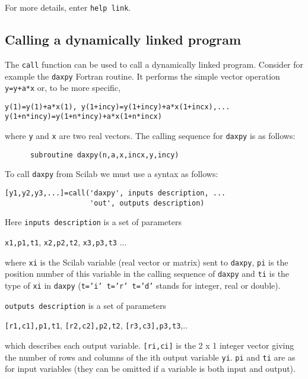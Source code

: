 For more details, enter {\tt help link}.

\subsection{Calling a dynamically linked program}

The {\tt call} function can be used to call a dynamically linked
program. Consider for example the {\tt daxpy} Fortran routine. It performs 
the simple vector operation {\tt y=y+a*x} or, to be more specific, 
\begin{verbatim}
y(1)=y(1)+a*x(1), y(1+incy)=y(1+incy)+a*x(1+incx),...
y(1+n*incy)=y(1+n*incy)+a*x(1+n*incx)
\end{verbatim} 
where {\tt y} and {\tt x} are two real vectors.
The calling sequence for {\tt daxpy} is as follows:
\begin{verbatim}
      subroutine daxpy(n,a,x,incx,y,incy)
\end{verbatim}
To call {\tt daxpy} from Scilab we must use a syntax as follows: 
\begin{verbatim}
[y1,y2,y3,...]=call('daxpy', inputs description, ...
                    'out', outputs description)
\end{verbatim}
\noindent
Here {\tt inputs description} is a set of parameters
 
{\tt x1,p1,t1}, {\tt x2,p2,t2}, {\tt x3,p3,t3} ... 

\noindent
where {\tt xi} is the Scilab variable (real vector or matrix) sent to 
{\tt daxpy},
{\tt pi} is the position number of this variable in the calling
sequence of {\tt daxpy} and {\tt ti} is the type of {\tt xi} in {\tt daxpy}
({\tt t='i'  t='r'  t='d'} stands for integer, real or double).

\noindent
{\tt outputs description} is a set of parameters
 
{\tt [r1,c1],p1,t1}, {\tt [r2,c2],p2,t2}, {\tt [r3,c3],p3,t3},..

\noindent
which describes each output variable. {\tt [ri,ci]} is the
2 x 1 integer vector giving the number of rows and columns of the
ith output variable {\tt yi}. {\tt pi} and {\tt ti} are as for
input variables (they can be omitted if a variable is both input and
output). 

